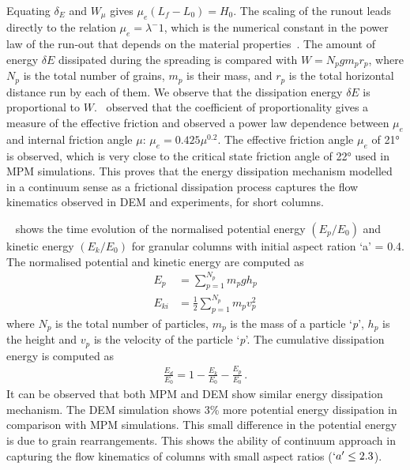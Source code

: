 Equating $\delta_E$ and $W_{\mu}$ gives $\mu_e (L_f - L_0) = H_0$. The scaling
of the runout leads directly to the relation $\mu_e = \lambda^-1$, which is the 
numerical constant in the power law of the run-out that depends on the material 
properties~\citep{Balmforth2005}. The amount of energy $\delta E$ dissipated 
during the spreading is compared with $W = N_p g m_p r_p$, where $N_p$ is the 
total number of grains, $m_p$ is their mass, and $r_p$ is the total horizontal 
distance run by each of them. We observe that the dissipation energy $\delta E$ 
is proportional to $W$.~\cite{Staron2006a} observed that the coefficient of 
proportionality gives a measure of the effective friction and 
observed a power law dependence between $\mu_e$ and internal friction angle 
$\mu$: $\mu_e=0.425\mu^{0.2}$. The effective friction angle $\mu_e$ of 
21\si{\degree} is observed, which is very close to the critical state friction 
angle of 22\si{\degree} used in MPM simulations. This proves that the energy 
dissipation mechanism modelled in a continuum sense as a frictional dissipation 
process captures the flow kinematics observed in DEM and experiments, for short 
columns.

~ shows the time evolution of the normalised potential energy 
$(E_{p}/E_0)$ and kinetic energy $(E_{k}/E_0)$ for granular columns with 
initial aspect ration `a' = 0.4. The normalised potential and kinetic energy 
are computed as
%
\begin{align}
E_p & = \sum\limits_{p=1}^{N_p}{m_p g h_p} \\
E_{ki} & = \frac{1}{2}\sum\limits_{p=1}^{N_p}{m_p v_p^2}
\end{align}
%
where $N_p$ is the total number of particles, $m_p$ is 
the mass of a particle `\textit{p}', $h_p$ is the height and 
$v_p$ is the velocity of the particle `\textit{p}'. The cumulative dissipation 
energy is computed as
%
\begin{align}
\frac{E_d}{E_0} = 1 - \frac{E_k}{E_0} - \frac{E_p}{E_0} \,.
\end{align}
%
It can be observed that both MPM and DEM show similar energy dissipation 
mechanism. The DEM simulation shows 3\% more potential energy dissipation in 
comparison with MPM simulations. This small difference in the potential energy 
is due to grain rearrangements. This shows the ability of continuum approach in 
capturing the flow kinematics of columns with small aspect ratios ($`a' \le 
2.3$). 

